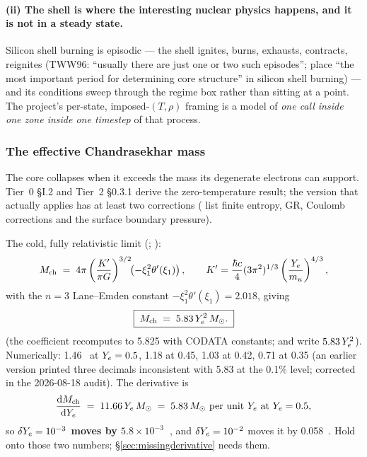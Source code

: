 \paragraph{(ii) The shell is where the interesting nuclear physics happens, and
it is not in a steady state.} Silicon shell burning is episodic --- the shell
ignites, burns, exhausts, contracts, reignites (TWW96: ``usually there are just
one or two such episodes''; \citealt{heger2001} place ``the most important
period for determining core structure'' in silicon shell burning) --- and its
conditions sweep through the regime box rather than sitting at a point. The
project's per-state, imposed-$(T, \rho)$ framing is a model of \emph{one call
inside one zone inside one timestep} of that process.

\subsubsection{The effective Chandrasekhar mass}
\label{sec:mch}

The core collapses when it exceeds the mass its degenerate electrons can
support. Tier~0 \S I.2 and Tier~2 \S 0.3.1 derive the zero-temperature result;
the version that actually applies has at least two corrections
(\citealt{timmes1996} list finite entropy, GR, Coulomb corrections and the
surface boundary pressure).

The cold, fully relativistic limit (\citealt{chandrasekhar1931,
chandrasekhar1939}; \citealt[eq.~3.3.17]{shapiro1983}):
%
\begin{equation}
M_{\mathrm{ch}} \;=\; 4\pi\left(\frac{K'}{\pi G}\right)^{3/2}\!\!\left(-\xi_1^2\theta'(\xi_1)\right),
\qquad K' = \frac{\hbar c}{4}(3\pi^2)^{1/3}\left(\frac{Y_{e}}{m_u}\right)^{4/3},
\label{eq:mch-general}
\end{equation}
%
with the $n = 3$ Lane--Emden constant $-\xi_1^2\theta'(\xi_1) = 2.018$, giving
%
\begin{equation}
\boxed{\;M_{\mathrm{ch}} \;=\; 5.83\,Y_{e}^{2}\,M_{\odot}.\;}
\label{eq:mch}
\end{equation}
%
(the coefficient recomputes to 5.825 with CODATA constants;
\citealt[eq.~1]{timmes1996} and \citealt{heger2001} write $5.83\,Y_{e}^2$).
Numerically: 1.46~\Msun{} at $Y_{e} = 0.5$, 1.18 at 0.45, 1.03 at 0.42, 0.71 at
0.35 (an earlier version printed three decimals inconsistent with 5.83 at the
0.1\% level; corrected in the 2026-08-18 audit). \derivedhere{} The derivative
is
%
\begin{equation}
\frac{\mathrm{d}M_{\mathrm{ch}}}{\mathrm{d}Y_{e}} \;=\; 11.66\,Y_{e}\,M_{\odot} \;=\; 5.83\,M_{\odot}\ \text{per unit } Y_{e} \text{ at } Y_{e} = 0.5,
\label{eq:dmchdye}
\end{equation}
%
so \textbf{$\delta Y_{e} = 10^{-3}$ moves \Mch{} by $5.8 \times 10^{-3}$~\Msun},
and $\delta Y_{e} = 10^{-2}$ moves it by 0.058~\Msun. Hold onto those two
numbers; \S\ref{sec:missingderivative} needs them.

